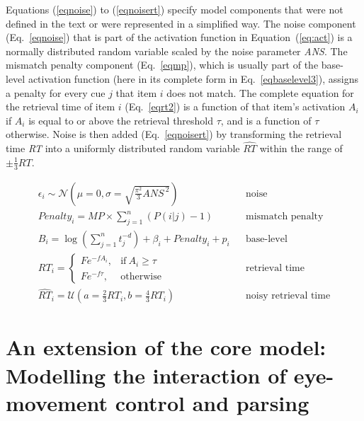 \documentclass{cambridge7A}\usepackage[]{graphicx}\usepackage[]{color}
\begin{document}
\begin{subappendices}
Equations (\ref{eqnoise}) to (\ref{eqnoisert}) specify model components that were not defined in the text or were represented in a simplified way.
The noise component (Eq.~\ref{eqnoise}) that is part of the activation function in Equation~(\ref{eq:act}) is a normally distributed random variable scaled by the noise parameter \textit{ANS}.
The mismatch penalty component (Eq.~\ref{eqmp}), which is usually part of the base-level activation function (here in its complete form in Eq.~\ref{eqbaselevel3}), assigns a penalty for every cue $j$ that item $i$ does not match.
The complete equation for the retrieval time of item $i$ (Eq.~\ref{eqrt2}) is a function of that item's activation $A_i$ if $A_i$ is equal to or above the retrieval threshold $\tau$, and is a function of $\tau$ otherwise.
Noise is then added (Eq.~\ref{eqnoisert}) by transforming the retrieval time \textit{RT} into a uniformly distributed random variable $\widehat{\textit{RT}}$ within the range of $\pm\frac{1}{3}\textit{RT}$.

\begin{eqnarray}
  \epsilon_i \sim \mathcal{N}(\mu = 0, \sigma = \sqrt{\frac{\pi^2}{3} \textit{ANS}^{\ 2}}) && \text{noise} \label{eqnoise} \\
	\textit{Penalty}_i = \textit{MP} \times \sum_{j=1}^n (P(i|j)-1) && \text{mismatch penalty} \label{eqmp} \\
  B_i = \log(\sum_{j=1}^n t_j^{-d}) + \beta_i + \textit{Penalty}_i + p_i  && \text{base-level} \label{eqbaselevel3} \\
  \textit{RT}_i = 
		\begin{cases}
      Fe^{-fA_i}, & \text{if}\ A_i \geq \tau \\
      Fe^{-f\tau}, & \text{otherwise}
    \end{cases}  && \text{retrieval time} \label{eqrt2} \\
  \widehat{\textit{RT}}_i = \mathcal{U}(a = \frac{2}{3} \textit{RT}_i, b = \frac{4}{3} \textit{RT}_i) && \text{noisy retrieval time} \label{eqnoisert}
\end{eqnarray}

\end{subappendices}

\chapter[Extension: Eye-movement control and parsing]{An extension of the core model: 
Modelling the interaction of eye-movement control and parsing} \label{c02emma}
\end{document}
